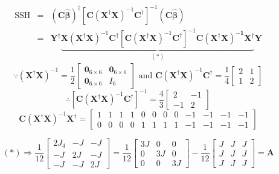 \documentclass{article}
\begin{document}
\begin{eqnarray*}
\text{SSH} &=&\left( \mathbf{C\hat{\beta}}\right) ^{\dagger }\left[ \mathbf{C%
}\left( \mathbf{X}^{\dagger }\mathbf{X}\right) ^{-1}\mathbf{C}^{\dagger }%
\right] ^{-1}\left( \mathbf{C\hat{\beta}}\right) \\
&=&\mathbf{Y}^{\dagger }\underset{\left( \ast \right) }{\underbrace{\mathbf{X%
}\left( \mathbf{X}^{\dagger }\mathbf{X}\right) ^{-1}\mathbf{C}^{\dagger }%
\left[ \mathbf{C}\left( \mathbf{X}^{\dagger }\mathbf{X}\right) ^{-1}\mathbf{C%
}^{\dagger }\right] ^{-1}\mathbf{C\left( \mathbf{X}^{\dagger }\mathbf{X}%
\right) ^{-1}\mathbf{X}^{\dagger }}}}\mathbf{Y}
\end{eqnarray*}%
\begin{equation*}
\because \left( \mathbf{X}^{\dagger }\mathbf{X}\right) ^{-1}=\frac{1}{2}%
\left[ 
\begin{array}{cc}
\mathbf{0}_{6\times 6} & \mathbf{0}_{6\times 6} \\ 
\mathbf{0}_{6\times 6} & I_{6}%
\end{array}%
\right] \text{ and }\mathbf{C}\left( \mathbf{X}^{\dagger }\mathbf{X}\right)
^{-1}\mathbf{C}^{\dagger }=\frac{1}{4}\left[ 
\begin{array}{cc}
2 & 1 \\ 
1 & 2%
\end{array}%
\right]
\end{equation*}%
\begin{equation*}
\therefore \left[ \mathbf{C}\left( \mathbf{X}^{\dagger }\mathbf{X}\right)
^{-1}\mathbf{C}^{\dagger }\right] ^{-1}=\frac{4}{3}\left[ 
\begin{array}{cc}
2 & -1 \\ 
-1 & 2%
\end{array}%
\right]
\end{equation*}%
\begin{equation*}
\mathbf{C}\left( \mathbf{X}^{\dagger }\mathbf{X}\right) ^{-1}\mathbf{X}%
^{\dagger }=\left[ 
\begin{array}{cccccccccccc}
1 & 1 & 1 & 1 & 0 & 0 & 0 & 0 & -1 & -1 & -1 & -1 \\ 
0 & 0 & 0 & 0 & 1 & 1 & 1 & 1 & -1 & -1 & -1 & -1%
\end{array}%
\right]
\end{equation*}

\begin{equation*}
\left( \ast \right) \Rightarrow \frac{1}{12}\left[ 
\begin{array}{ccc}
2J_{4} & -J & -J \\ 
-J & 2J & -J \\ 
-J & -J & 2J%
\end{array}%
\right] =\frac{1}{12}\left[ 
\begin{array}{ccc}
3J & 0 & 0 \\ 
0 & 3J & 0 \\ 
0 & 0 & 3J%
\end{array}%
\right] -\frac{1}{12}\left[ 
\begin{array}{ccc}
J & J & J \\ 
J & J & J \\ 
J & J & J%
\end{array}%
\right] =\mathbf{A}
\end{equation*}
\end{document}

